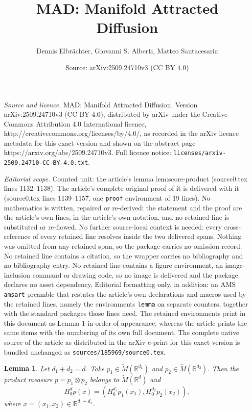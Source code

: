 \documentclass[10pt,a4paper]{amsart}
\title{MAD: Manifold Attracted Diffusion}
\author{Dennis Elbr\"achter, Giovanni S. Alberti, Matteo Santacesaria}
\date{Source: arXiv:2509.24710v3 (CC BY 4.0)}
\newtheorem{lemma}{Lemma}
\newcommand{\R}{\mathbb{R}}
\begin{document}
\maketitle

\noindent\emph{Source and licence.} MAD: Manifold Attracted Diffusion. Version arXiv:2509.24710v3 (CC BY 4.0), distributed by arXiv under the Creative Commons Attribution 4.0 International licence, http://creativecommons.org/licenses/by/4.0/, as recorded in the arXiv licence metadata for this exact version and shown on the abstract page https://arxiv.org/abs/2509.24710v3. Full licence notice: \texttt{licenses/arxiv-2509.24710-CC-BY-4.0.txt}.\par\smallskip

\noindent\textit{Editorial scope.} Counted unit: the article's lemma lem:score-product (source0.tex lines 1132--1138). The article's complete original proof of it is delivered with it (source0.tex lines 1139--1157, one \texttt{proof} environment of 19 lines). No mathematics is written, repaired or re-derived: the statement and the proof are the article's own lines, in the article's own notation, and no retained line is substituted or re-flowed.  No further source-local context is needed: every cross-reference of every retained line resolves inside the two delivered spans.  Nothing was omitted from any retained span, so the package carries no omission record.  No retained line contains a citation, so the wrapper carries no bibliography and no bibliography entry.  No retained line contains a figure environment, an image-inclusion command or drawing code, so no image is delivered and the package declares no asset dependency.  Editorial formatting only, in addition: an AMS \texttt{amsart} preamble that restates the article's own declarations and macros used by the retained lines, namely the environments \texttt{lemma} on separate counters, together with the standard packages those lines need.  The retained environments print in this document as Lemma 1 in order of appearance, whereas the article prints the same items with the numbering of its own full document.  The complete native source of the article as distributed in the arXiv e-print for this exact version is bundled unchanged as \texttt{sources/185969/source0.tex}.
\begin{lemma}\label{lem:score-product}
    Let $d_1+d_2=d$. Take $p_1\in \widetilde{M}(\R^{d_1})$  and $p_2\in \widetilde{M}(\R^{d_2})$. Then the product measure $p=p_1\otimes p_2$ belongs to $\widetilde{M}(\R^{d})$ and
    \[
H^d_0 p(x)=(H^{d_1}_0 p_1(x_1),H_0^{d_2} p_2(x_2)),
    \]
    where $x=(x_1,x_2)\in \R^{d_1+d_2}$.
\end{lemma}
\end{document}
